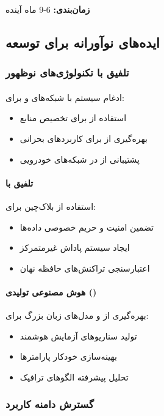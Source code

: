 \documentclass[11pt]{article}
\begin{document}
\textbf{زمان‌بندی:} 6-9 ماه آینده

\subsection{ایده‌های نوآورانه برای توسعه}

\subsubsection{تلفیق با تکنولوژی‌های نوظهور}

\paragraph{}
ادغام سیستم با شبکه‌های  و  برای:
\begin{itemize}
\item استفاده از  برای تخصیص منابع
\item بهره‌گیری از  برای کاربردهای بحرانی
\item پشتیبانی از  در شبکه‌های خودرویی
\end{itemize}

\paragraph{تلفیق با }
استفاده از بلاک‌چین برای:
\begin{itemize}
\item تضمین امنیت و حریم خصوصی داده‌ها
\item ایجاد سیستم پاداش غیرمتمرکز
\item اعتبارسنجی تراکنش‌های حافظه نهان
\end{itemize}

\paragraph{هوش مصنوعی تولیدی ()}
بهره‌گیری از  و مدل‌های زبان بزرگ برای:
\begin{itemize}
\item تولید سناریوهای آزمایش هوشمند
\item بهینه‌سازی خودکار پارامترها
\item تحلیل پیشرفته الگوهای ترافیک
\end{itemize}

\subsubsection{گسترش دامنه کاربرد}
\end{document}
